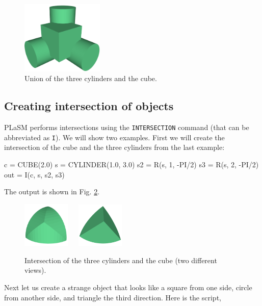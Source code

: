 \begin{figure}[!ht]
\begin{center}
\includegraphics[width=0.35\textwidth]{img/diff-3.png}
\end{center}
\vspace{-4mm}
\caption{Union of the three cylinders and the cube.}
\label{fig:union}
\end{figure}


\subsection{Creating intersection of objects}\label{subsec:intersection}

PLaSM performs intersections using the {\tt INTERSECTION} command (that can be 
abbreviated as {\tt I}). We will show two examples. First we will create the 
intersection of the cube and the three cylinders from the last example:
 
\begin{bluecode}
c = CUBE(2.0)
s = CYLINDER(1.0, 3.0)
s2 = R(s, 1, -PI/2)
s3 = R(s, 2, -PI/2)
out = I(c, s, s2, s3) 
\end{bluecode}
\newpage
\noindent
The output is shown in Fig. \ref{fig:int-2}.


\begin{figure}[!ht]
\begin{center}
\includegraphics[width=0.2\textwidth]{img/int-2a.png}\ \ \ 
\includegraphics[width=0.2\textwidth]{img/int-2b.png}
\end{center}
\vspace{-4mm}
\caption{Intersection of the three cylinders and the cube (two different views).}
\label{fig:int-2}
\end{figure}
\noindent
Next let us create 
a strange object that looks like a square from one side,
circle from another side, and triangle the third direction. 
Here is the script,

